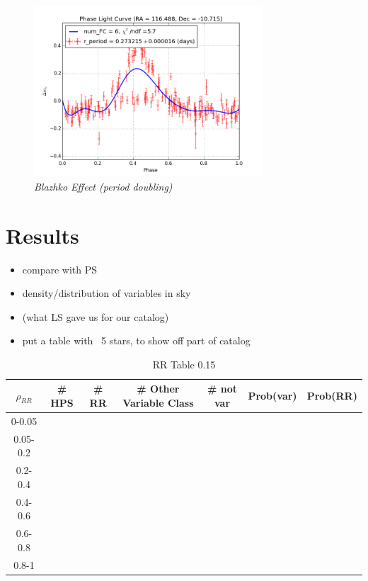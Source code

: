 \documentclass[aps,prb,twocolumn,superscriptaddress]{revtex4-1}
\begin{document}
	\begin{figure}[H]
	 \centering
	 	\includegraphics[width=3.35in]{figures/rPLCneg45E_limit2_grp_116-11_03117.png}
	 \caption{\it \small{Blazhko Effect (period doubling)}}
	 \label{fig:Blazhko}
	\end{figure}
\fi



\section{Results}
\begin{itemize}
	\item{} compare with PS~\cite{PSdata}
	\item{} density/distribution of variables in sky
	\item{} (what LS gave us for our catalog)
	\item{} put a table with ~5 stars, to show off part of catalog
\end{itemize}

\iffalse
	\begin{table}[H]
	\begin{center}
		\begin{tabular}{ | c | c | c | c | c | c | c | }\hline
		$\rho_{RR}$ & \# HPS & \# RR & \# Other Variable Class & \# not var & Prob(var) & Prob(RR) \\ \hline
		0-0.05 &&&&&& \\ \hline
		0.05-0.2 &&&&&& \\ \hline
		0.2-0.4 &&&&&& \\ \hline
		0.4-0.6 &&&&&& \\ \hline
		0.6-0.8 &&&&&& \\ \hline
		0.8-1 &&&&&& \\ \hline
		\end{tabular}
	\end{center}
	\caption{ \small{RR Table 0.15 \label{tab:rrtab}}}
	\end{table}
\end{document}
